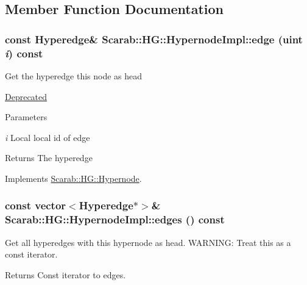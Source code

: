 \subsection{Member Function Documentation}
\hypertarget{class_scarab_1_1_h_g_1_1_hypernode_impl_a328189f28a4185d435035686a27592c2}{
\subsubsection[{edge}]{\setlength{\rightskip}{0pt plus 5cm}const {\bf Hyperedge}\& Scarab::HG::HypernodeImpl::edge (uint {\em i}) const}}
\label{class_scarab_1_1_h_g_1_1_hypernode_impl_a328189f28a4185d435035686a27592c2}
Get the hyperedge this node as head \begin{Desc}
\item[\hyperlink{deprecated__deprecated000009}{Deprecated}]\end{Desc}

\begin{DoxyParams}{Parameters}
\item[{\em i}]Local local id of edge\end{DoxyParams}
\begin{DoxyReturn}{Returns}
The hyperedge 
\end{DoxyReturn}


Implements \hyperlink{class_scarab_1_1_h_g_1_1_hypernode_a3bface6832eb54a00d90e4fe8d1999f7}{Scarab::HG::Hypernode}.

\hypertarget{class_scarab_1_1_h_g_1_1_hypernode_impl_ada979dcddc1bf0abf0fc2530d1ea8761}{
\subsubsection[{edges}]{\setlength{\rightskip}{0pt plus 5cm}const vector$<${\bf Hyperedge}$\ast$$>$\& Scarab::HG::HypernodeImpl::edges () const}}
\label{class_scarab_1_1_h_g_1_1_hypernode_impl_ada979dcddc1bf0abf0fc2530d1ea8761}
Get all hyperedges with this hypernode as head. WARNING: Treat this as a const iterator. \begin{DoxyReturn}{Returns}
Const iterator to edges. 
\end{DoxyReturn}


